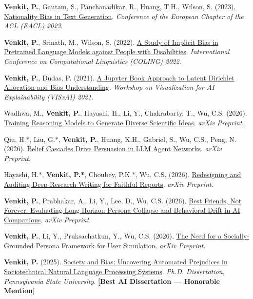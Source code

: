 {\begin{cvitems}
  \item {\textbf{Venkit, P.}, Gautam, S., Panchanadikar, R., Huang, T.H., Wilson, S. (2023). \href{https://aclanthology.org/2023.eacl-main.9/}{Nationality Bias in Text Generation}. \textit{Conference of the European Chapter of the ACL (EACL) 2023}.}
  \item {\textbf{Venkit, P.}, Srinath, M., Wilson, S. (2022). \href{https://aclanthology.org/2022.coling-1.113.pdf}{A Study of Implicit Bias in Pretrained Language Models against People with Disabilities}. \textit{International Conference on Computational Linguistics (COLING) 2022}.}
  \item {\textbf{Venkit, P.}, Dudas, P. (2021). \href{https://dudaspm.github.io/LDA_Bias_Data/}{A Jupyter Book Approach to Latent Dirichlet Allocation and Bias Understanding}. \textit{Workshop on Visualization for AI Explainability (VISxAI) 2021}.}
\end{cvitems}

\vspace{3mm}\begin{cvitems}
  \item {Wadhwa, M., \textbf{Venkit, P.}, Hayashi, H., Li, Y., Chakrabarty, T., Wu, C.S. (2026). \href{https://arxiv.org/abs/2610.22324}{Training Reasoning Models to Generate Diverse Scientific Ideas}. \textit{arXiv Preprint}.}
  \item {Qiu, H.*, Liu, G.*, \textbf{Venkit, P.}, Huang, K.H., Gabriel, S., Wu, C.S., Peng, N. (2026). \href{https://arxiv.org/abs/2608.25152}{Belief Cascades Drive Persuasion in LLM Agent Networks}. \textit{arXiv Preprint}.}
  \item {Hayashi, H.*, \textbf{Venkit, P.*}, Choubey, P.K.*, Wu, C.S. (2026). \href{https://arxiv.org/abs/2608.28643}{Redesigning and Auditing Deep Research Writing for Faithful Reports}. \textit{arXiv Preprint}.}
  \item {\textbf{Venkit, P.}, Prabhakar, A., Li, Y., Lee, D., Wu, C.S. (2026). \href{https://arxiv.org/abs/2607.28818}{Best Friends, Not Forever: Evaluating Long-Horizon Persona Collapse and Behavioral Drift in AI Companions}. \textit{arXiv Preprint}.}
  \item {\textbf{Venkit, P.}, Li, Y., Pruksachatkun, Y., Wu, C.S. (2026). \href{https://arxiv.org/abs/2601.07110}{The Need for a Socially-Grounded Persona Framework for User Simulation}. \textit{arXiv Preprint}.}
\end{cvitems}

\vspace{3mm}\begin{cvitems}
  \item {\textbf{Venkit, P.} (2025). \href{https://etda.libraries.psu.edu/catalog/20178pnv5011}{Society and Bias: Uncovering Automated Prejudices in Sociotechnical Natural Language Processing Systems}. \textit{Ph.D. Dissertation, Pennsylvania State University}. \textbf{[Best AI Dissertation --- Honorable Mention]}}
\end{cvitems}
}
